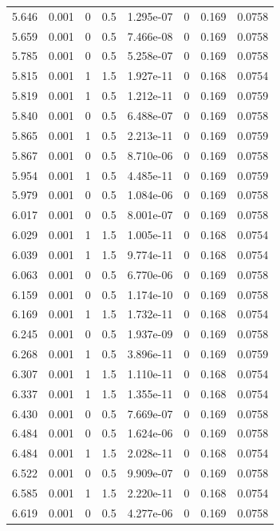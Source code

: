 \documentclass[preview]{standalone}
\begin{document}
{{{{\begin{tabular}{L{1.2cm}C{1.2cm} C{0.3cm}C{0.5cm} C{1.4cm}C{1.4cm} C{1.4cm}C{1.4cm}}
  5.646  &  0.001  & 0     & 0.5 &  1.295e-07  & 0  & 0.169 &  0.0758   \\ 
  5.659  &  0.001  & 0     & 0.5 &  7.466e-08  & 0  & 0.169 &  0.0758   \\ 
  5.785  &  0.001  & 0     & 0.5 &  5.258e-07  & 0  & 0.169 &  0.0758   \\ 
  5.815  &  0.001  & 1     & 1.5 &  1.927e-11  & 0  & 0.168 &  0.0754   \\ 
  5.819  &  0.001  & 1     & 0.5 &  1.212e-11  & 0  & 0.169 &  0.0759   \\ 
  5.840  &  0.001  & 0     & 0.5 &  6.488e-07  & 0  & 0.169 &  0.0758   \\ 
  5.865  &  0.001  & 1     & 0.5 &  2.213e-11  & 0  & 0.169 &  0.0759   \\ 
  5.867  &  0.001  & 0     & 0.5 &  8.710e-06  & 0  & 0.169 &  0.0758   \\ 
  5.954  &  0.001  & 1     & 0.5 &  4.485e-11  & 0  & 0.169 &  0.0759   \\ 
  5.979  &  0.001  & 0     & 0.5 &  1.084e-06  & 0  & 0.169 &  0.0758   \\ 
  6.017  &  0.001  & 0     & 0.5 &  8.001e-07  & 0  & 0.169 &  0.0758   \\ 
  6.029  &  0.001  & 1     & 1.5 &  1.005e-11  & 0  & 0.168 &  0.0754   \\ 
  6.039  &  0.001  & 1     & 1.5 &  9.774e-11  & 0  & 0.168 &  0.0754   \\ 
  6.063  &  0.001  & 0     & 0.5 &  6.770e-06  & 0  & 0.169 &  0.0758   \\ 
  6.159  &  0.001  & 0     & 0.5 &  1.174e-10  & 0  & 0.169 &  0.0758   \\ 
  6.169  &  0.001  & 1     & 1.5 &  1.732e-11  & 0  & 0.168 &  0.0754   \\ 
  6.245  &  0.001  & 0     & 0.5 &  1.937e-09  & 0  & 0.169 &  0.0758   \\ 
  6.268  &  0.001  & 1     & 0.5 &  3.896e-11  & 0  & 0.169 &  0.0759   \\ 
  6.307  &  0.001  & 1     & 1.5 &  1.110e-11  & 0  & 0.168 &  0.0754   \\ 
  6.337  &  0.001  & 1     & 1.5 &  1.355e-11  & 0  & 0.168 &  0.0754   \\ 
  6.430  &  0.001  & 0     & 0.5 &  7.669e-07  & 0  & 0.169 &  0.0758   \\ 
  6.484  &  0.001  & 0     & 0.5 &  1.624e-06  & 0  & 0.169 &  0.0758   \\ 
  6.484  &  0.001  & 1     & 1.5 &  2.028e-11  & 0  & 0.168 &  0.0754   \\ 
  6.522  &  0.001  & 0     & 0.5 &  9.909e-07  & 0  & 0.169 &  0.0758   \\ 
  6.585  &  0.001  & 1     & 1.5 &  2.220e-11  & 0  & 0.168 &  0.0754   \\ 
  6.619  &  0.001  & 0     & 0.5 &  4.277e-06  & 0  & 0.169 &  0.0758   \\ 
\hline 
\end{tabular} 

}}}}
\end{document}
